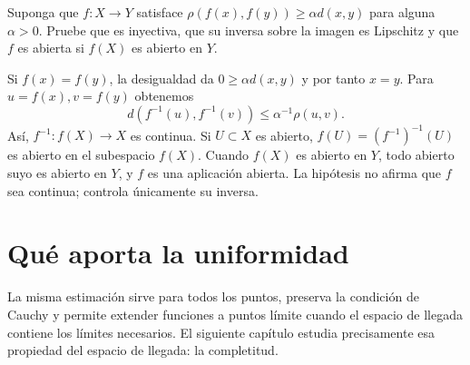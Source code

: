 \begin{ejercicio}
Suponga que $f:X\to Y$ satisface $\rho(f(x),f(y))\geq\alpha d(x,y)$ para alguna $\alpha>0$. Pruebe que es inyectiva, que su inversa sobre la imagen es Lipschitz y que $f$ es abierta si $f(X)$ es abierto en $Y$.
\end{ejercicio}
\begin{solucion}
Si $f(x)=f(y)$, la desigualdad da $0\geq\alpha d(x,y)$ y por tanto $x=y$. Para $u=f(x),v=f(y)$ obtenemos
\[
 d(f^{-1}(u),f^{-1}(v))\leq\alpha^{-1}\rho(u,v).
\]
Así, $f^{-1}:f(X)\to X$ es continua. Si $U\subset X$ es abierto, $f(U)=(f^{-1})^{-1}(U)$ es abierto en el subespacio $f(X)$. Cuando $f(X)$ es abierto en $Y$, todo abierto suyo es abierto en $Y$, y $f$ es una aplicación abierta. La hipótesis no afirma que $f$ sea continua; controla únicamente su inversa.
\end{solucion}

\section{Qué aporta la uniformidad}
La misma estimación sirve para todos los puntos, preserva la condición de Cauchy y permite extender funciones a puntos límite cuando el espacio de llegada contiene los límites necesarios. El siguiente capítulo estudia precisamente esa propiedad del espacio de llegada: la completitud.
